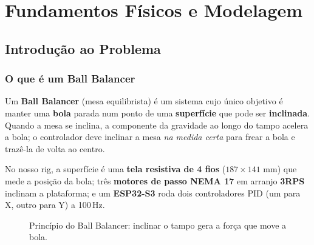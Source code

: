 \part{Fundamentos F\'isicos e Modelagem}

\chapter{Introdu\c{c}\~ao ao Problema}\label{cap:intro}

\section{O que \'e um Ball Balancer}
Um \textbf{Ball Balancer} (mesa equilibrista) \'e um sistema cujo \'unico objetivo
\'e manter uma \textbf{bola} parada num ponto de uma \textbf{superf\'icie} que pode
ser \textbf{inclinada}. Quando a mesa se inclina, a componente da gravidade ao
longo do tampo acelera a bola; o controlador deve inclinar a mesa \emph{na medida
certa} para frear a bola e traz\^e-la de volta ao centro.

\begin{projeto}
No nosso rig, a superf\'icie \'e uma \textbf{tela resistiva de 4 fios}
($187\times141$ mm) que mede a posi\c{c}\~ao da bola; tr\^es \textbf{motores de
passo NEMA 17} em arranjo \textbf{3RPS} inclinam a plataforma; e um \textbf{ESP32-S3}
roda dois controladores PID (um para X, outro para Y) a 100\,Hz.
\end{projeto}

\begin{figure}[h]\centering
{}
\caption{Princ\'ipio do Ball Balancer: inclinar o tampo gera a for\c{c}a que move a bola.}
\label{fig:principio}
\end{figure}


